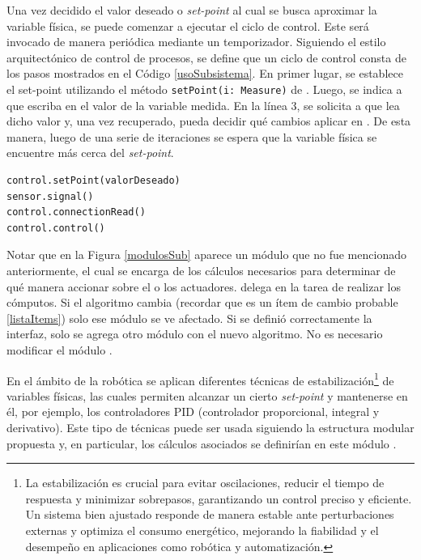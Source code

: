 Una vez decidido el valor deseado o \textit{set-point} al cual se busca aproximar la variable física, se puede comenzar a ejecutar el ciclo de control. Este será invocado de manera periódica mediante un temporizador. Siguiendo el estilo arquitectónico de control de procesos, se define que un ciclo de control consta de los pasos mostrados en el Código \ref{usoSubsistema}. En primer lugar, se establece el set-point utilizando el método \verb|setPoint(i: Measure)| de \Control. Luego, se indica a \Sensor que escriba en \Pipe el valor de la variable medida. En la línea 3, se solicita a \Control que lea dicho valor y, una vez recuperado, pueda decidir qué cambios aplicar en \Actuador. De esta manera, luego de una serie de iteraciones se espera que la variable física se encuentre más cerca del \textit{set-point}.

\begin{lstlisting}[caption=Ejemplo de uso del subsistema.,label={usoSubsistema}]
control.setPoint(valorDeseado)
sensor.signal()
control.connectionRead()
control.control()
\end{lstlisting}

Notar que en la Figura \ref{modulosSub} aparece un módulo que no fue mencionado anteriormente, \Algoritmo el cual se encarga de los cálculos necesarios para determinar de qué manera accionar sobre el o los actuadores. \Control delega en \Algoritmo la tarea de realizar los cómputos. Si el algoritmo cambia (recordar que es un ítem de cambio probable \ref{listaItems}) solo ese módulo se ve afectado. Si se definió correctamente la interfaz, solo se agrega otro módulo con el nuevo algoritmo. No es necesario modificar el módulo \Control.

En el ámbito de la robótica se aplican diferentes técnicas de estabilización\footnote{La estabilización es crucial para evitar oscilaciones, reducir el tiempo de respuesta y minimizar sobrepasos, garantizando un control preciso y eficiente. Un sistema bien ajustado responde de manera estable ante perturbaciones externas y optimiza el consumo energético, mejorando la fiabilidad y el desempeño en aplicaciones como robótica y automatización.} de variables físicas, las cuales permiten alcanzar un cierto \textit{set-point} y mantenerse en él, por ejemplo, los controladores \gls{PID}\cite{pidlibro} (controlador proporcional, integral y derivativo). Este tipo de técnicas puede ser usada siguiendo la estructura modular propuesta y, en particular, los cálculos asociados se definirían en este módulo \Algoritmo.

